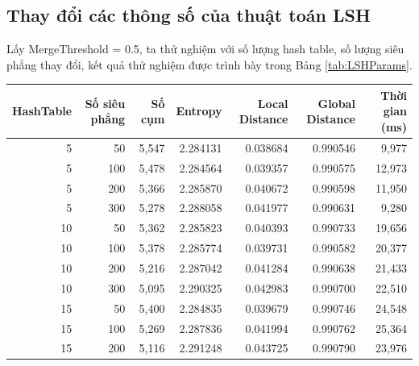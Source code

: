 	\subsection{Thay đổi các thông số của thuật toán LSH}
		Lấy MergeThreshold = 0.5, ta thử nghiệm với số lượng hash table, số lượng siêu phẳng thay đổi, kết quả thử nghiệm được trình bày trong Bảng \ref{tab:LSHParams}.
		\begin{table}
			\centering
			\setlength\extrarowheight{3pt}
			\begin{tabular}{|r|r|r|r|r|r|r|}
				\hline
				HashTable     & Số siêu phẳng   & Số cụm        & Entropy       & Local Distance & Global Distance & Thời gian (ms) \bigstrut[b]\\			
				\hline
				5             & 50            & 5,547         & 2.284131      & 0.038684      & 0.990546      & 9,977 \bigstrut\\
				\hline
				5             & 100           & 5,478         & 2.284564      & 0.039357      & 0.990575      & 12,973 \bigstrut\\
				\hline
				5             & 200           & 5,366         & 2.285870      & 0.040672      & 0.990598      & 11,950 \bigstrut\\
				\hline
				5             & 300           & 5,278         & 2.288058      & 0.041977      & 0.990631      & 9,280 \bigstrut\\
				\hline
				10            & 50            & 5,362         & 2.285823      & 0.040393      & 0.990733      & 19,656 \bigstrut\\
				\hline
				10            & 100           & 5,378         & 2.285774      & 0.039731      & 0.990582      & 20,377 \bigstrut\\
				\hline
				10            & 200           & 5,216         & 2.287042      & 0.041284      & 0.990638      & 21,433 \bigstrut\\
				\hline
				10            & 300           & 5,095         & 2.290325      & 0.042983      & 0.990700      & 22,510 \bigstrut\\
				\hline
				15            & 50            & 5,400         & 2.284835      & 0.039679      & 0.990746      & 24,548 \bigstrut\\
				\hline
				15            & 100           & 5,269         & 2.287836      & 0.041994      & 0.990762      & 25,364 \bigstrut\\
				\hline
				15            & 200           & 5,116         & 2.291248      & 0.043725      & 0.990790      & 23,976 \bigstrut\\

\end{tabular}
\end{table}
